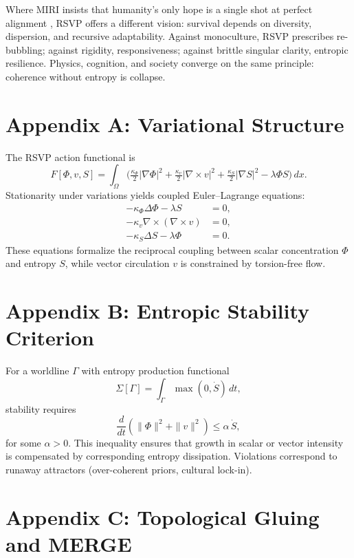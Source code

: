 \documentclass[12pt]{article}
\begin{document}
Where MIRI insists that humanity’s only hope is a single shot at perfect alignment \citep{yudkowsky2025IABIED}, RSVP offers a different vision: survival depends on diversity, dispersion, and recursive adaptability. Against monoculture, RSVP prescribes re-bubbling; against rigidity, responsiveness; against brittle singular clarity, entropic resilience. Physics, cognition, and society converge on the same principle: coherence without entropy is collapse.


\newpage
\appendix

\section*{Appendix A: Variational Structure}

The RSVP action functional is
\[
F[\Phi,v,S] = \int_\Omega \Big(\tfrac{\kappa_\Phi}{2}|\nabla\Phi|^2 + \tfrac{\kappa_v}{2}|\nabla\times v|^2 + \tfrac{\kappa_S}{2}|\nabla S|^2 - \lambda \Phi S\Big)\,dx.
\]
Stationarity under variations yields coupled Euler–Lagrange equations:
\begin{align*}
-\kappa_\Phi \Delta \Phi - \lambda S &= 0, \\
-\kappa_v \nabla \times (\nabla \times v) &= 0, \\
-\kappa_S \Delta S - \lambda \Phi &= 0.
\end{align*}
These equations formalize the reciprocal coupling between scalar concentration $\Phi$ and entropy $S$, while vector circulation $v$ is constrained by torsion-free flow.

\section*{Appendix B: Entropic Stability Criterion}

For a worldline $\Gamma$ with entropy production functional
\[
\Sigma[\Gamma] = \int_\Gamma \max(0,\dot S)\,dt,
\]
stability requires
\[
\frac{d}{dt} \left( \|\Phi\|^2 + \|v\|^2 \right) \leq \alpha\, \dot S,
\]
for some $\alpha > 0$. This inequality ensures that growth in scalar or vector intensity is compensated by corresponding entropy dissipation. Violations correspond to runaway attractors (over-coherent priors, cultural lock-in).

\section*{Appendix C: Topological Gluing and MERGE}
\end{document}
